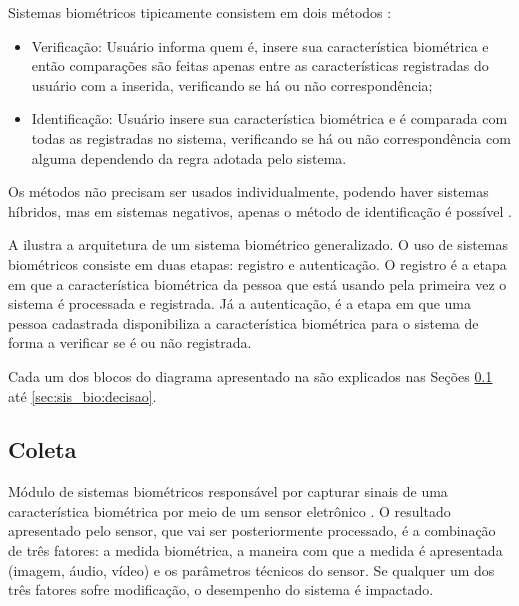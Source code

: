 \par Sistemas biométricos tipicamente consistem em dois métodos \cite{wayman2005biometric}:

\begin{itemize}
    \item Verificação: Usuário informa quem é, insere sua característica biométrica e então comparações são feitas apenas entre as características registradas do usuário com a inserida, verificando se há ou não correspondência;
    \item Identificação: Usuário insere sua característica biométrica e é comparada com todas as registradas no sistema, verificando se há ou não correspondência com alguma dependendo da regra adotada pelo sistema.
\end{itemize}

\par Os métodos não precisam ser usados individualmente, podendo haver sistemas híbridos, mas em sistemas negativos, apenas o método de identificação é possível \cite{wayman2005biometric}.

\par A  ilustra a arquitetura de um sistema biométrico generalizado. O uso de sistemas biométricos consiste em duas etapas: registro e autenticação. O registro é a etapa em que a característica biométrica da pessoa que está usando pela primeira vez o sistema é processada e registrada. Já a autenticação, é a etapa em que uma pessoa cadastrada disponibiliza a característica biométrica para o sistema de forma a verificar se é ou não registrada.

\par Cada um dos blocos do diagrama apresentado na  são explicados nas Seções \ref{sec:sis_bio:coleta} até \ref{sec:sis_bio:decisao}.


\subsection{Coleta} \label{sec:sis_bio:coleta}

\par Módulo de sistemas biométricos responsável por capturar sinais de uma característica biométrica por meio de um sensor eletrônico \cite{wayman2005biometric}. O resultado apresentado pelo sensor, que vai ser posteriormente processado, é a combinação de três fatores: a medida biométrica, a maneira com que a medida é apresentada (imagem, áudio, vídeo) e os parâmetros técnicos do sensor. Se qualquer um dos três fatores sofre modificação, o desempenho do sistema é impactado.

